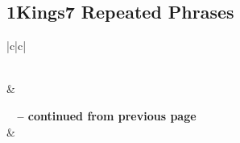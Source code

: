 \subsection{1Kings7 Repeated Phrases}


\normalsize
 
\begin{center}
\begin{longtable}{|c|c|}
\caption[1Kings7 Repeated Phrases]{1Kings7 Repeated Phrases}\label{table:Repeated Phrases 1Kings7} \\
\hline {} &  \\ \hline 
\endfirsthead
 
{{\bfseries \tablename\ \thetable{} -- continued from previous page}} \\  
\hline {} &  \\ \hline 
\endhead
 

\end{longtable}
\end{center}
